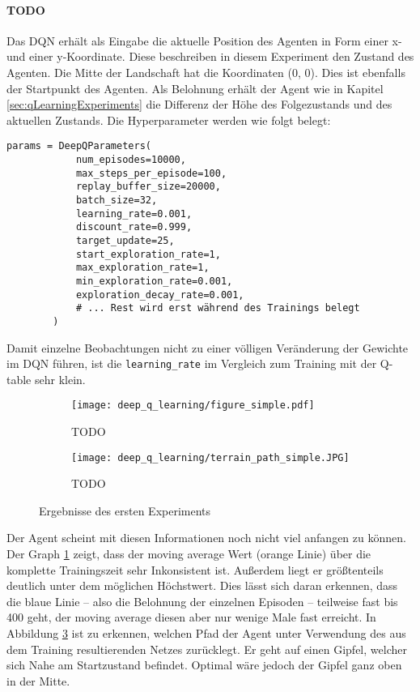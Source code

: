 \paragraph{TODO}
Das DQN erhält als Eingabe die aktuelle Position des Agenten in Form einer x- und einer y-Koordinate. Diese beschreiben in diesem Experiment den Zustand des Agenten. Die Mitte der Landschaft hat die Koordinaten (0, 0). Dies ist ebenfalls der Startpunkt des Agenten. Als Belohnung erhält der Agent wie in Kapitel \ref{sec:qLearningExperiments} die Differenz der Höhe des Folgezustands und des aktuellen Zustands. Die Hyperparameter werden wie folgt belegt:
\begin{verbatim}
params = DeepQParameters(
            num_episodes=10000,
            max_steps_per_episode=100,
            replay_buffer_size=20000,
            batch_size=32,
            learning_rate=0.001,
            discount_rate=0.999,
            target_update=25,
            start_exploration_rate=1,
            max_exploration_rate=1,
            min_exploration_rate=0.001,
            exploration_decay_rate=0.001,
            # ... Rest wird erst während des Trainings belegt
        )
\end{verbatim}
Damit einzelne Beobachtungen nicht zu einer völligen Veränderung der Gewichte im DQN führen, ist die \texttt{learning_rate} im Vergleich zum Training mit der Q-table sehr klein.
\begin{figure}[H]
    \centering
    \begin{subfigure}[b]{0.49\textwidth}
        \texttt{[image: deep\_q\_learning/figure\_simple.pdf]}
        \caption{TODO}
        \label{img:graphDeepQSimple}
    \end{subfigure}
    \begin{subfigure}[b]{0.49\textwidth}
        \texttt{[image: deep\_q\_learning/terrain\_path\_simple.JPG]}
        \caption{TODO}
        \label{img:pathDeepQSimple}
    \end{subfigure}
    \caption{Ergebnisse des ersten Experiments}
\end{figure}
Der Agent scheint mit diesen Informationen noch nicht viel anfangen zu können. Der Graph \ref{img:graphDeepQSimple} zeigt, dass der moving average Wert (orange Linie) über die komplette Trainingszeit sehr Inkonsistent ist. Außerdem liegt er größtenteils deutlich unter dem möglichen Höchstwert. Dies lässt sich daran erkennen, dass die blaue Linie -- also die Belohnung der einzelnen Episoden -- teilweise fast bis 400 geht, der moving average diesen aber nur wenige Male fast erreicht. In Abbildung \ref{img:pathDeepQSimple} ist zu erkennen, welchen Pfad der Agent unter Verwendung des aus dem Training resultierenden Netzes zurücklegt. Er geht auf einen Gipfel, welcher sich Nahe am Startzustand befindet. Optimal wäre jedoch der Gipfel ganz oben in der Mitte.

